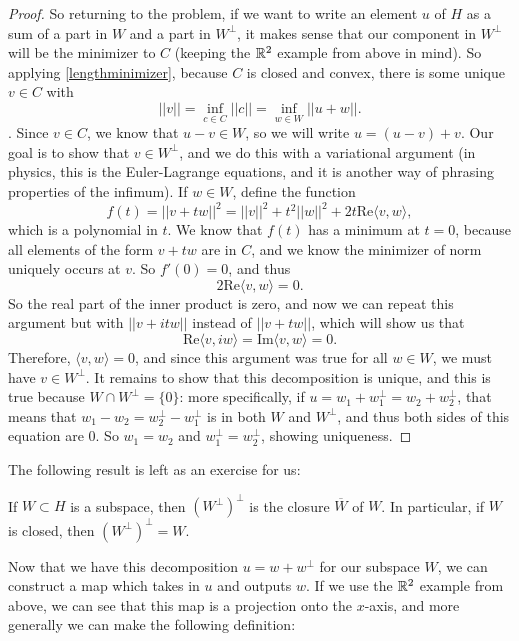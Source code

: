 \begin{proof}
So returning to the problem, if we want to write an element $u$ of $H$ as a sum of a part in $W$ and a part in $W^\perp$, it makes sense that our component in $W^\perp$ will be the minimizer to $C$ (keeping the $\mathbb R^2$ example from above in mind). So applying \cref{lengthminimizer}, because $C$ is closed and convex, there is some unique $v \in C$ with 
\[
    ||v|| = \inf_{c \in C} ||c|| = \inf_{w \in W} ||u + w||.
\].
Since $v \in C$, we know that $u - v \in W$, so we will write $u = (u-v) + v$. Our goal is to show that $v \in W^\perp$, and we do this with a variational argument (in physics, this is the Euler-Lagrange equations, and it is another way of phrasing properties of the infimum). If $w \in W$, define the function 
\[
    f(t) = ||v + tw||^2 = ||v||^2 + t^2 ||w||^2 + 2t \text{Re}\langle v, w \rangle,
\]
which is a polynomial in $t$. We know that $f(t)$ has a minimum at $t = 0$, because all elements of the form $v + tw$ are in $C$, and we know the minimizer of norm uniquely occurs at $v$. So $f'(0) = 0$, and thus
\[
    2 \text{Re}\langle v, w \rangle = 0.
\]
So the real part of the inner product is zero, and now we can repeat this argument but with $||v + itw||$ instead of $||v + tw||$, which will show us that 
\[
    \text{Re}\langle v, iw \rangle = \text{Im}\langle v, w \rangle = 0. 
\]
Therefore, $\langle v, w \rangle = 0$, and since this argument was true for all $w \in W$, we must have $v \in W^\perp$. It remains to show that this decomposition is unique, and this is true because $W \cap W^\perp = \{0\}$: more specifically, if $u = w_1 + w_1^\perp = w_2 + w_2^\perp$, that means that $w_1 - w_2 = w_2^\perp - w_1^\perp$ is in both $W$ and $W^\perp$, and thus both sides of this equation are $0$. So $w_1 = w_2$ and $w_1^\perp = w_2^\perp$, showing uniqueness.
\end{proof}

The following result is left as an exercise for us:

\begin{theorem}
If $W \subset H$ is a subspace, then $(W^\perp)^\perp$ is the closure $\overline{W}$ of $W$. In particular, if $W$ is closed, then $(W^\perp)^\perp = W$.
\end{theorem}

Now that we have this decomposition $u = w + w^\perp$ for our subspace $W$, we can construct a map which takes in $u$ and outputs $w$. If we use the $\mathbb R^2$ example from above, we can see that this map is a projection onto the $x$-axis, and more generally we can make the following definition:

